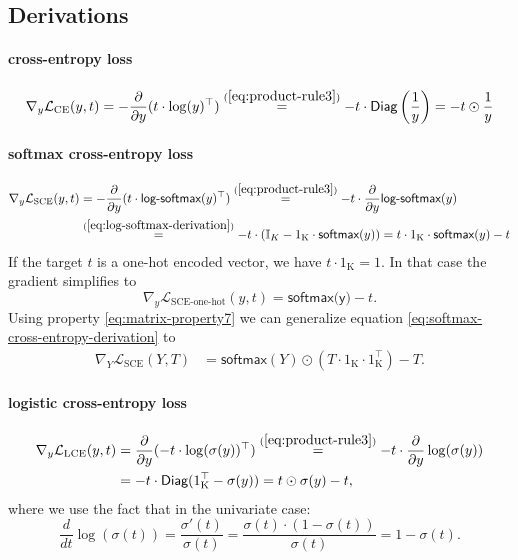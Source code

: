 \documentclass[twoside,11pt]{article}
\newcommand{\const}[1]{\ensuremath{\mathrm{#1}}} %
\newcommand{\func}[1]{\ensuremath{\textsf{#1}}} %
\newcommand{\Partial}[1]{\frac{\partial}{\partial #1}}
\begin{document}
\subsection{Derivations}

\paragraph{cross-entropy loss}
\begin{align}
\begin{split}
\nabla_y \mathcal{L}_\text{CE}(y, t)
&= - \Partial{y} (t \cdot \log(y)^\top)
\overset{(\ref{eq:product-rule3})}{=} - t \cdot \func{Diag}\left(\frac{1}{y}\right)
= - t \odot \frac{1}{y} \\
\end{split}
\end{align}

\paragraph{softmax cross-entropy loss}
\begin{align}
\label{eq:softmax-cross-entropy-derivation}
\begin{split}
\nabla_y \mathcal{L}_\text{SCE}(y, t) 
&= - \Partial{y} (t \cdot \func{log-softmax}(y)^\top)
\overset{(\ref{eq:product-rule3})}{=} - t \cdot \Partial{y} \func{log-softmax}(y) 
\\
& \overset{(\ref{eq:log-softmax-derivation})}{=} -t \cdot \left(\mathbb{I}_K - 1_\const{K} \cdot \func{softmax}(y) \right)
= t \cdot 1_\const{K} \cdot \func{softmax}(y) - t
\end{split}
\end{align}
If the target $t$ is a one-hot encoded vector, we have $t \cdot 1_\const{K} = 1$. In that case the gradient simplifies to
\[
  \nabla_y \mathcal{L}_\text{SCE-one-hot}(y, t) = \func{softmax(y)} - t.
\]
Using property \eqref{eq:matrix-property7} we can generalize equation \eqref{eq:softmax-cross-entropy-derivation} to
\begin{align*}
\nabla_Y \mathcal{L}_\text{SCE}(Y, T)
&= \func{softmax}(Y) \odot (T \cdot 1_\const{K} \cdot 1_\const{K}^\top) - T.
\end{align*}

\paragraph{logistic cross-entropy loss}
\begin{align*}
\nabla_y \mathcal{L}_\text{LCE}(y, t) 
&= \Partial{y}(-t \cdot \log(\sigma(y))^\top)
\overset{(\ref{eq:product-rule3})}{=} -t \cdot \Partial{y}\log(\sigma(y))
\\
&= - t \cdot \func{Diag}(1_\const{K}^\top - \sigma(y))
= t \odot \sigma(y) - t,
\end{align*}
where we use the fact that in the univariate case:
\begin{equation*}
    \dfrac{d}{dt}\log(\sigma(t)) = \dfrac{\sigma'(t)}{\sigma(t)} = \dfrac{\sigma(t) \cdot (1 - \sigma(t))}{\sigma(t)} = 1-\sigma(t).
\end{equation*}
\end{document}
